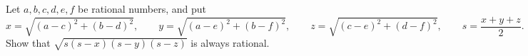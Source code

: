 Let $a,b,c,d,e,f$ be rational numbers, and put
\[x=\sqrt{(a-c)^2+(b-d)^2},\qquad y=\sqrt{(a-e)^2+(b-f)^2},\qquad z=\sqrt{(c-e)^2+(d-f)^2},\qquad s=\dfrac{x+y+z}{2}.\]
Show that $\sqrt{s(s-x)(s-y)(s-z)}$ is always rational.
